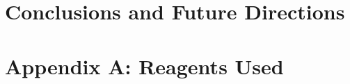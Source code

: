 \documentclass[PhD]{dukethesis2006}
\begin{document}
\begin{doublespace}

\end{doublespace}

\chapter{Conclusions and Future Directions}\label{conclusions}

\begin{doublespace}

\end{doublespace}

\chapter{Appendix A: Reagents Used}\label{reagents}

\begin{doublespace}

\end{doublespace}

%
%

%

% 
\printbibliography[category=cited]
\printbibliography[title={Cite Me Please},notcategory=cited]

	
\biography
\end{document}
